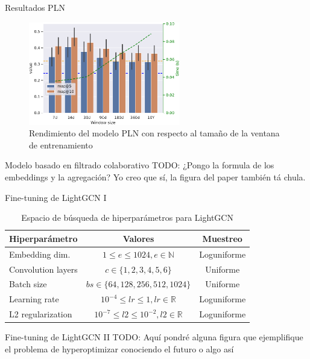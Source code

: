 \begin{frame}{Resultados PLN}
    \begin{figure}
        \centering
        \includegraphics[height=45mm]{./images/graphs/11_cosine_results_window-size_W-THU_normalize=True.pdf}
        \caption{Rendimiento del modelo PLN con respecto al tamaño de la ventana de entrenamiento}
    \end{figure}
\end{frame}

\begin{frame}{Modelo basado en filtrado colaborativo}
    TODO: ¿Pongo la formula de los embeddings y la agregación? Yo creo que sí, la figura del paper también tá chula.
\end{frame}

\begin{frame}{Fine-tuning de LightGCN I}
\begin{table}[]
    \centering
    \begin{tabular}{l|c|c}
\textbf{Hiperparámetro} & \textbf{Valores} & \textbf{Muestreo} \\
\hline
Embedding dim. & $1\leq e\leq 1024, e\in \mathbb{N}$ & Loguniforme \\
Convolution layers & $c\in \{1,2,3,4,5,6\}$ & Uniforme \\
Batch size & $bs\in\{64,128,256,512,1024\}$ & Uniforme \\
Learning rate & $10^{-4}\leq lr\leq 1, lr\in \mathbb{R}$ & Loguniforme \\
L2 regularization & $10^{-7}\leq l2 \leq 10^{-2}, l2 \in \mathbb{R}$ & Loguniforme \\
    \end{tabular}
    \caption{Espacio de búsqueda de hiperparámetros para LightGCN}
\end{table}
\end{frame}

\begin{frame}{Fine-tuning de LightGCN II}
    TODO: Aquí pondré alguna figura que ejemplifique el problema de hyperoptimizar conociendo el futuro o algo así
\end{frame}

